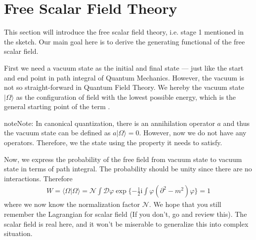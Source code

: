 \documentclass[letterpaper,10pt,english]{sphinxmanual}
\begin{document}
\section{Free Scalar Field Theory}
\label{\detokenize{qft_free_sc::doc}}\label{\detokenize{qft_free_sc:free-scalar-field-theory}}
This section will introduce the free scalar field theory, i.e. stage 1 mentioned in the sketch. Our main goal here is to derive the generating functional of the free scalar field.

First we need a vacuum state as the initial and final state --- just like the start and end point in path integral of Quantum Mechanics. However, the vacuum is not so straight-forward in Quantum Field Theory. We hereby  the vacuum state \(|\Omega\rangle\) as the configuration of field with the lowest possible energy, which is the general starting point of the term .

\begin{sphinxadmonition}{note}{Note:}
In canonical quantization, there is an annihilation operator \(a\) and thus the vacuum state can be defined as \(a|\Omega\rangle=0\). However, now we do not have any operators. Therefore, we  the state using the property it needs to satisfy.
\end{sphinxadmonition}

Now, we express the probability of the free field from vacuum state to vacuum state in terms of path integral. The probability should be unity since there are no interactions. Therefore
\begin{equation*}
\begin{split}W = \langle\Omega|\Omega\rangle = \mathcal{N}\int\mathcal{D}\varphi\exp\{-\frac{1}{2}\mathrm{i}\int\varphi(\partial^2\!\!-\!m^2)\varphi\} = 1\end{split}
\end{equation*}
where we now know the normalization factor \(\mathcal{N}\). We hope that you still remember the Lagrangian for scalar field (If you don't, go and review this). The scalar field is real here, and it won't be miserable to generalize this into complex situation.
\end{document}
